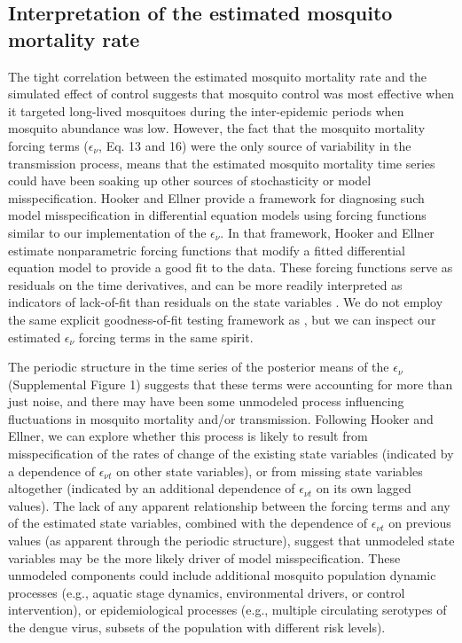 \documentclass[10pt,letterpaper]{article}
\begin{document}
\subsection*{Interpretation of the estimated mosquito mortality rate}

The tight correlation between the estimated mosquito mortality rate and the simulated effect of control suggests that mosquito control was most effective when it targeted long-lived mosquitoes during the inter-epidemic periods when mosquito abundance was low.  
However, the fact that the mosquito mortality forcing terms ($\epsilon_{\nu}$, Eq. 13 and 16) were the only source of variability in the transmission process, means that the estimated mosquito mortality time series could have been soaking up other sources of stochasticity or model misspecification.
Hooker and Ellner \cite{Hooker2015} provide a framework for diagnosing such model misspecification in differential equation models using forcing functions similar to our implementation of the $\epsilon_{\nu}$.
In that framework, Hooker and Ellner \cite{Hooker2015} estimate nonparametric forcing functions that modify a fitted differential equation model to provide a good fit to the data.
These forcing functions serve as residuals on the time derivatives, and can be more readily interpreted as indicators of lack-of-fit than residuals on the state variables \cite{Hotelling1927, Hooker2015}.
We do not employ the same explicit goodness-of-fit testing framework as \cite{Hooker2015}, but we can inspect our estimated $\epsilon_{\nu}$ forcing terms in the same spirit.

The periodic structure in the time series of the posterior means of the $\epsilon_{\nu}$ (Supplemental Figure 1) suggests that these terms were accounting for more than just noise, and there may have been some unmodeled process influencing fluctuations in mosquito mortality and/or transmission.
Following Hooker and Ellner, we can explore whether this process is likely to result from misspecification of the rates of change of the existing state variables (indicated by a dependence of $\epsilon_{\nu t}$ on other state variables), or from missing state variables altogether (indicated by an additional dependence of $\epsilon_{\nu t}$ on its own lagged values). 
The lack of any apparent relationship between the forcing terms and any of the estimated state variables, combined with the dependence of $\epsilon_{\nu t}$ on previous values (as apparent through the periodic structure), suggest that unmodeled state variables may be the more likely driver of model misspecification.
These unmodeled components could include additional mosquito population dynamic processes (e.g., aquatic stage dynamics, environmental drivers, or control intervention), or epidemiological processes (e.g., multiple circulating serotypes of the dengue virus, subsets of the population with different risk levels).
\end{document}
